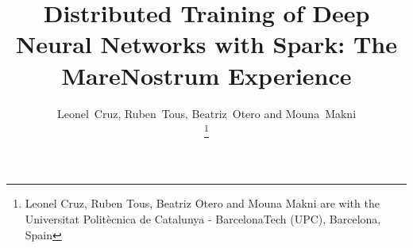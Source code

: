 \documentclass[journal]{IEEEtran}
\begin{document}
\title{Distributed Training of Deep Neural Networks with Spark: The MareNostrum Experience}

%

%                       

		
\author{
		Leonel~Cruz,
        Ruben~Tous,
        Beatriz~Otero and
        Mouna~Makni 
                       
\thanks{Leonel Cruz, Ruben Tous, Beatriz Otero and Mouna Makni are with the Universitat Polit\`ecnica de Catalunya - BarcelonaTech (UPC), Barcelona, Spain}
                       
}


%


\maketitle\thispagestyle{empty}
\end{document}
